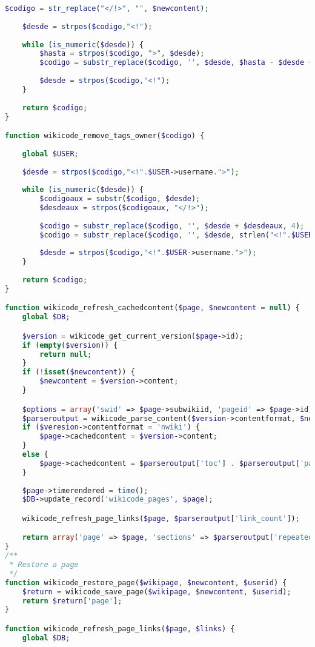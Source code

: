 \begin{lstlisting}[language=PHP]
	$codigo = str_replace("</!>", "", $newcontent);
	
	$desde = strpos($codigo,"<!");
	
	while (is_numeric($desde)) {
		$hasta = strpos($codigo, ">", $desde);
		$codigo = substr_replace($codigo, '', $desde, $hasta - $desde + 1);
		
		$desde = strpos($codigo,"<!");
	}
	
	return $codigo;
}

function wikicode_remove_tags_owner($codigo) {
	
	global $USER;
	
	$desde = strpos($codigo,"<!".$USER->username.">");
	
	while (is_numeric($desde)) {
		$codigoaux = substr($codigo, $desde);
		$desdeaux = strpos($codigoaux, "</!>");
		
		$codigo = substr_replace($codigo, '', $desde + $desdeaux, 4);
		$codigo = substr_replace($codigo, '', $desde, strlen("<!".$USER->username.">"));
		
		$desde = strpos($codigo,"<!".$USER->username.">");
	}
	
	return $codigo;
}

function wikicode_refresh_cachedcontent($page, $newcontent = null) {
    global $DB;

    $version = wikicode_get_current_version($page->id);
    if (empty($version)) {
        return null;
    }
    if (!isset($newcontent)) {
        $newcontent = $version->content;
    }

    $options = array('swid' => $page->subwikiid, 'pageid' => $page->id);
    $parseroutput = wikicode_parse_content($version->contentformat, $newcontent, $options);
	if ($veresion->contentformat = 'nwiki') {
		$page->cachedcontent = $version->content;
	}
	else {
		$page->cachedcontent = $parseroutput['toc'] . $parseroutput['parsed_text'];
	}
    
    $page->timerendered = time();
    $DB->update_record('wikicode_pages', $page);

    wikicode_refresh_page_links($page, $parseroutput['link_count']);

    return array('page' => $page, 'sections' => $parseroutput['repeated_sections'], 'version' => $version->version);
}
/**
 * Restore a page
 */
function wikicode_restore_page($wikipage, $newcontent, $userid) {
    $return = wikicode_save_page($wikipage, $newcontent, $userid);
    return $return['page'];
}

function wikicode_refresh_page_links($page, $links) {
    global $DB;


\end{lstlisting}
